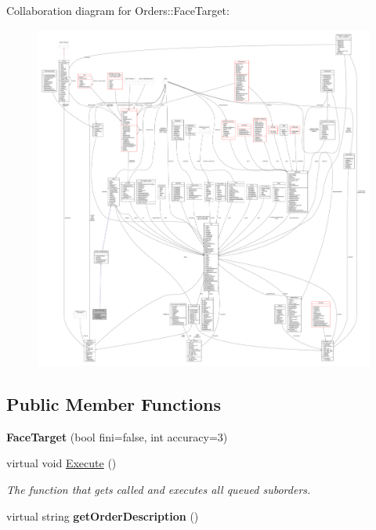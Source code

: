 Collaboration diagram for Orders\+:\+:Face\+Target\+:
\nopagebreak
\begin{figure}[H]
\begin{center}
\leavevmode
\includegraphics[width=350pt]{d8/d96/classOrders_1_1FaceTarget__coll__graph}
\end{center}
\end{figure}
\subsection*{Public Member Functions}
\begin{DoxyCompactItemize}
\item 
{\bfseries Face\+Target} (bool fini=false, int accuracy=3)\hypertarget{classOrders_1_1FaceTarget_ab567b64801edd8de918149280c9b899e}{}\label{classOrders_1_1FaceTarget_ab567b64801edd8de918149280c9b899e}

\item 
virtual void \hyperlink{classOrders_1_1FaceTarget_aea0a3dfe713941481cf02e0487b76bef}{Execute} ()\hypertarget{classOrders_1_1FaceTarget_aea0a3dfe713941481cf02e0487b76bef}{}\label{classOrders_1_1FaceTarget_aea0a3dfe713941481cf02e0487b76bef}

\begin{DoxyCompactList}\small\item\em The function that gets called and executes all queued suborders. \end{DoxyCompactList}\item 
virtual string {\bfseries get\+Order\+Description} ()\hypertarget{classOrders_1_1FaceTarget_a2828cb78138771d967461d83c47f6969}{}\label{classOrders_1_1FaceTarget_a2828cb78138771d967461d83c47f6969}

\end{DoxyCompactItemize}

